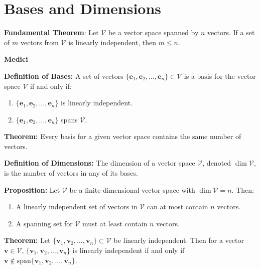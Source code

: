 \documentclass{article}
\newcommand{\spann}[1]{\mathrm{span}\{#1\}}
\begin{document}
    \section{Bases and Dimensions}
    \begin{theorem}
        \textbf{Fundamental Theorem}: Let $\mathcal{V}$ be a vector space spanned by $n$ vectors. If a set of $m$ vectors from $\mathcal{V}$ is linearly independent, then $m \le n$.
    \end{theorem}
    \begin{minipage}[t]{.45\textwidth} %
        \begin{center}
            \textbf{Medici}
        \end{center}
        \textbf{Definition of Bases:} A set of vectors $\{\bm{e}_1,\bm{e}_2,\dots,\bm{e}_n\} \in \mathcal{V}$ is a basis for the vector space $\mathcal{V}$ if and only if:
        \begin{enumerate}
            \item $\{\bm{e}_1,\bm{e}_2,\dots,\bm{e}_n\}$ is linearly independent.
            \item $\{\bm{e}_1,\bm{e}_2,\dots,\bm{e}_n\}$ spans $\mathcal{V}$.
        \end{enumerate}
        \vspace{2mm}

        \textbf{Theorem:} Every basis for a given vector space contains the same number of vectors.
        \vspace{2mm}

        \textbf{Definition of Dimensions:} The dimension of a vector space $\mathcal{V}$, denoted $\dim \mathcal{V}$, is the number of vectors in any of its bases.
        \vspace{2mm}

        \textbf{Proposition:} Let $\mathcal{V}$ be a finite dimensional vector space with $\dim \mathcal{V} = n$. Then:
        \begin{enumerate}
            \item A linearly independent set of vectors in $\mathcal{V}$ can at most contain $n$ vectors.
            \item A spanning set for $\mathcal{V}$ must at least contain $n$ vectors.
        \end{enumerate}
        \vspace{2mm}

        \textbf{Theorem:} Let $\{\bm{v}_1,\bm{v}_2,\dots,\bm{v}_n\} \subset \mathcal{V}$ be linearly independent. Then for a vector $\bm{v} \in \mathcal{V}$, $\{\bm{v}_1,\bm{v}_2,\dots,\bm{v}_n\}$ is linearly independent if and only if $\bm{v} \notin \spann{\bm{v}_1,\bm{v}_2,\dots,\bm{v}_n}$.
        \vspace{2mm}


\end{minipage}
\end{document}
